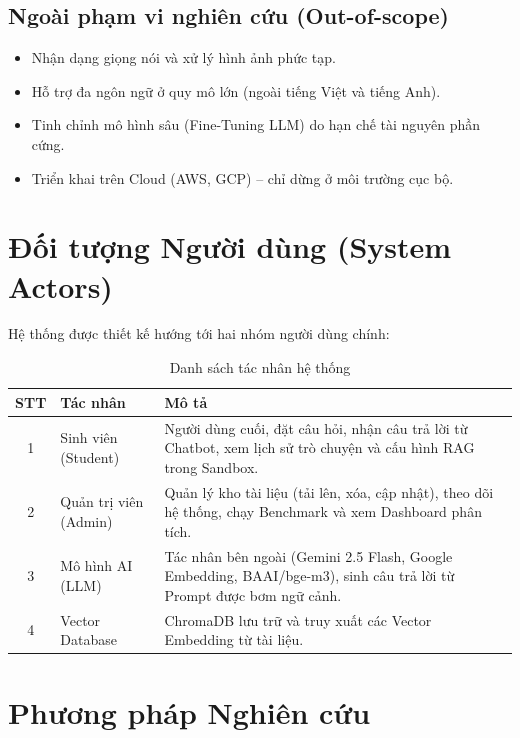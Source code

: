 \subsection{Ngoài phạm vi nghiên cứu (Out-of-scope)}

\begin{itemize}[itemsep=3pt]
  \item Nhận dạng giọng nói và xử lý hình ảnh phức tạp.
  \item Hỗ trợ đa ngôn ngữ ở quy mô lớn (ngoài tiếng Việt và tiếng Anh).
  \item Tinh chỉnh mô hình sâu (Fine-Tuning LLM) do hạn chế tài nguyên phần cứng.
  \item Triển khai trên Cloud (AWS, GCP) -- chỉ dừng ở môi trường cục bộ.
\end{itemize}

\section{Đối tượng Người dùng (System Actors)}

Hệ thống được thiết kế hướng tới hai nhóm người dùng chính:

\begin{table}[H]
  \centering
  \caption{Danh sách tác nhân hệ thống}
  \label{tab:actors}
  \renewcommand{\arraystretch}{1.4}
  \begin{tabularx}{\textwidth}{|c|l|X|}
    \hline
    \rowcolor{blue!15}
    \textbf{STT} & \textbf{Tác nhân} & \textbf{Mô tả} \\
    \hline
    1 & Sinh viên (Student) & Người dùng cuối, đặt câu hỏi, nhận câu trả lời từ Chatbot, xem lịch sử trò chuyện và cấu hình RAG trong Sandbox. \\
    \hline
    2 & Quản trị viên (Admin) & Quản lý kho tài liệu (tải lên, xóa, cập nhật), theo dõi hệ thống, chạy Benchmark và xem Dashboard phân tích. \\
    \hline
    3 & Mô hình AI (LLM) & Tác nhân bên ngoài (Gemini 2.5 Flash, Google Embedding, BAAI/bge-m3), sinh câu trả lời từ Prompt được bơm ngữ cảnh. \\
    \hline
    4 & Vector Database & ChromaDB lưu trữ và truy xuất các Vector Embedding từ tài liệu. \\
    \hline
  \end{tabularx}
\end{table}

\section{Phương pháp Nghiên cứu}

